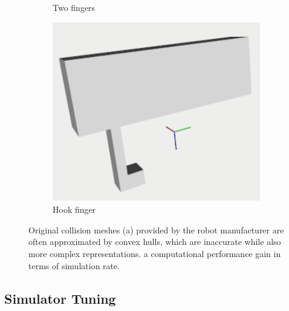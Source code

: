 \begin{figure}[t]
\begin{subfigure}{0.3\columnwidth}
    \caption{Two fingers}\label{fig:two_fingers}
\end{subfigure}%
\hfill
\begin{subfigure}{0.3\columnwidth}
    \includegraphics[width=\linewidth]{figures/hardware/single_hook_cropped.pdf}
    \caption{Hook finger}\label{fig:hook_finger}
\end{subfigure}

\caption{Original collision meshes (a) provided by the robot manufacturer are often approximated by convex hulls, which are inaccurate while also more complex representations.  a computational performance gain in terms of simulation rate.\label{fig:1}}

\end{figure}

\subsection{Simulator Tuning}
